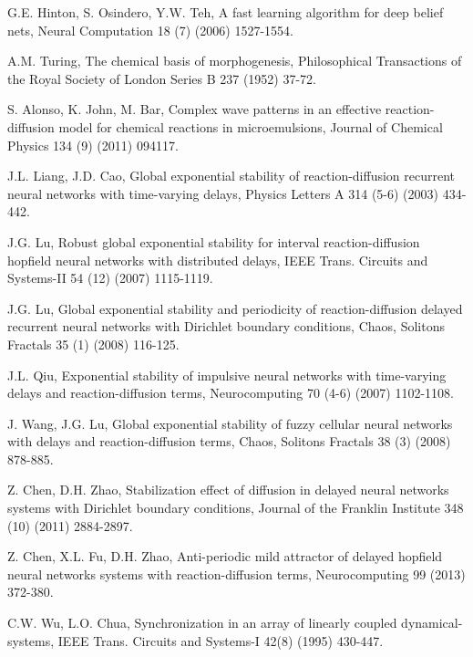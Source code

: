 \documentclass[review]{elsarticle}
\begin{document}
\begin{thebibliography}{99}
G.E. Hinton, S. Osindero, Y.W. Teh, A fast learning algorithm for deep belief nets, Neural Computation 18 (7) (2006) 1527-1554.

A.M. Turing, The chemical basis of morphogenesis, Philosophical Transactions of the Royal Society of London Series B 237 (1952) 37-72.

S. Alonso, K. John, M. Bar, Complex wave patterns in an effective reaction-diffusion model for chemical reactions in microemulsions, Journal of Chemical Physics 134 (9) (2011) 094117.

J.L. Liang, J.D. Cao, Global exponential stability of reaction-diffusion recurrent neural networks with time-varying delays, Physics Letters A 314 (5-6) (2003) 434-442.

J.G. Lu, Robust global exponential stability for interval reaction-diffusion hopfield neural networks with distributed delays, IEEE Trans. Circuits and Systems-II 54 (12) (2007) 1115-1119.

J.G. Lu, Global exponential stability and periodicity of reaction-diffusion delayed recurrent neural networks with Dirichlet boundary conditions, Chaos, Solitons  Fractals 35 (1) (2008) 116-125.

J.L. Qiu, Exponential stability of impulsive neural networks with time-varying delays and reaction-diffusion terms, Neurocomputing 70 (4-6) (2007) 1102-1108.

J. Wang, J.G. Lu, Global exponential stability of fuzzy cellular neural networks with delays and reaction-diffusion terms, Chaos, Solitons  Fractals 38 (3) (2008) 878-885.

Z. Chen, D.H. Zhao, Stabilization effect of diffusion in delayed neural networks systems with Dirichlet boundary conditions, Journal of the Franklin Institute 348 (10) (2011) 2884-2897.

Z. Chen, X.L. Fu, D.H. Zhao, Anti-periodic mild attractor of delayed hopfield neural networks systems with reaction-diffusion terms, Neurocomputing 99 (2013) 372-380.





C.W. Wu, L.O. Chua, Synchronization in an array of linearly coupled dynamical-systems, IEEE Trans. Circuits and Systems-I 42(8) (1995) 430-447.


\end{thebibliography}
\end{document}
